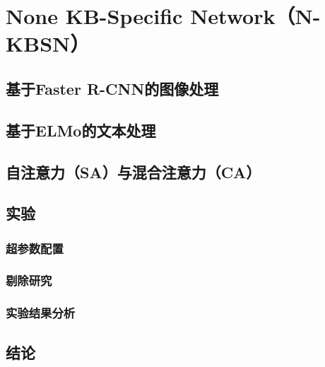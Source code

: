 
\chapter{None KB-Specific Network（N-KBSN）}

\section{基于Faster R-CNN的图像处理}

\section{基于ELMo的文本处理}

\section{自注意力（SA）与混合注意力（CA）}

\section{实验}
\subsection{超参数配置}
\subsection{剔除研究}
\subsection{实验结果分析}

\section{结论}
